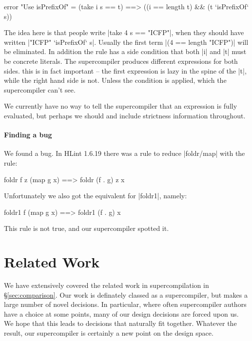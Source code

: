 \documentclass{sigplanconf}
\begin{document}
\begin{code}
error "Use isPrefixOf" = (take i s == t) ==> ((i == length t) && (t `isPrefixOf` s))
\end{code}

The idea here is that people write |take 4 s == "ICFP"|, when they should have written |"ICFP" `isPrefixOf` s|. Usually the first term |(4 == length "ICFP")| will be eliminated. In addition the rule has a side condition that both |i| and |t| must be concrete literals. The supercompiler produces different expressions for both sides. this is in fact important -- the first expression is lazy in the spine of the |t|, while the right hand side is not. Unless the condition is applied, which the supercompiler can't see.

We currently have no way to tell the supercompiler that an expression is fully evaluated, but perhaps we should and include strictness information throughout.

\paragraph{Finding a bug}

We found a bug. In HLint 1.6.19 there was a rule to reduce |foldr/map| with the rule:

\begin{code}
foldr f z (map g x) ==> foldr (f . g) z x
\end{code}

Unfortunately we also got the equivalent for |foldr1|, namely:

\begin{code}
foldr1 f (map g x) ==> foldr1 (f . g) x
\end{code}

This rule is not true, and our supercompiler spotted it.

\section{Related Work}

We have extensively covered the related work in supercompilation in \S\ref{sec:comparison}. Our work is definately classed as a supercompiler, but makes a large number of novel decisions. In particular, where often supercompiler authors have a choice at some points, many of our design decisions are forced upon us. We hope that this leads to decisions that naturally fit together. Whatever the result, our supercompiler is certainly a new point on the design space.
\end{document}
